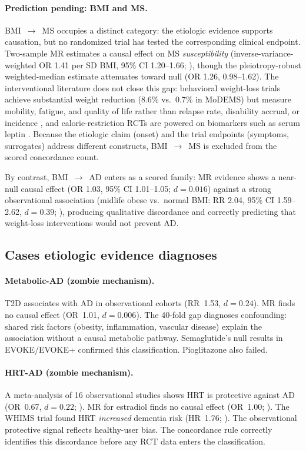 \documentclass[11pt]{article}
\begin{document}
\paragraph{Prediction pending: BMI and MS.}
BMI~$\to$~MS occupies a distinct category: the etiologic evidence supports causation, but no randomized trial has tested the corresponding clinical endpoint. Two-sample MR estimates a causal effect on MS \emph{susceptibility} (inverse-variance-weighted OR 1.41 per SD BMI, 95\% CI 1.20--1.66; \cite{mokry2016obesity}), though the pleiotropy-robust weighted-median estimate attenuates toward null (OR 1.26, 0.98--1.62). The interventional literature does not close this gap: behavioral weight-loss trials achieve substantial weight reduction (8.6\% vs.\ 0.7\% in MoDEMS) but measure mobility, fatigue, and quality of life rather than relapse rate, disability accrual, or incidence \cite{bruce2023modems}, and calorie-restriction RCTs are powered on biomarkers such as serum leptin \cite{ghezzi2025icr}. Because the etiologic claim (onset) and the trial endpoints (symptoms, surrogates) address different constructs, BMI~$\to$~MS is excluded from the scored concordance count.

By contrast, BMI~$\to$~AD enters as a scored family: MR evidence shows a near-null causal effect (OR 1.03, 95\% CI 1.01--1.05; $d = 0.016$) against a strong observational association (midlife obese vs.\ normal BMI: RR 2.04, 95\% CI 1.59--2.62, $d = 0.39$; \cite{anstey2011}), producing qualitative discordance and correctly predicting that weight-loss interventions would not prevent AD.

\subsection{Cases etiologic evidence diagnoses}

\paragraph{Metabolic-AD (zombie mechanism).} T2D associates with AD in observational cohorts (RR~1.53, $d = 0.24$). MR finds no causal effect (OR~1.01, $d = 0.006$). The 40-fold gap diagnoses confounding: shared risk factors (obesity, inflammation, vascular disease) explain the association without a causal metabolic pathway. Semaglutide's null results in EVOKE/EVOKE+ confirmed this classification. Pioglitazone also failed.

\paragraph{HRT-AD (zombie mechanism).} A meta-analysis of 16 observational studies shows HRT is protective against AD (OR~0.67, $d = 0.22$; \cite{song2020}). MR for estradiol finds no causal effect (OR~1.00; \cite{barth2025}). The WHIMS trial found HRT \emph{increased} dementia risk (HR~1.76; \cite{shumaker2003}). The observational protective signal reflects healthy-user bias. The concordance rule correctly identifies this discordance before any RCT data enters the classification.
\end{document}

